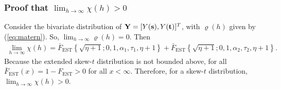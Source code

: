 \documentclass[11pt]{article}
\begin{document}
\subsubsection*{Proof that $\lim_{h \rightarrow \infty} \chi(h) > 0$}
Consider the bivariate distribution of $\mbox{\bf Y} = [Y(\mbox{\bf s}), Y(\mbox{\bf t})]^T$, with $\varrho(h)$ given by (\ref{eq:matern}).
So, $\lim_{h \rightarrow \infty} \varrho(h) = 0$.
Then
\begin{align}
  \lim_{h \rightarrow \infty} \chi(h) = \bar{F}_{\text{EST}}\left\{ \sqrt{\eta + 1}; 0, 1, \alpha_1, \tau_1, \eta + 1 \right\} + \bar{F}_{\text{EST}}\left\{ \sqrt{\eta + 1}; 0, 1, \alpha_2, \tau_2, \eta + 1 \right\}.
\end{align}
Because the extended skew-$t$ distribution is not bounded above, for all $\bar{F}_{\text{EST}}(x) = 1 - F_{\text{EST}} > 0$ for all $x < \infty$.
Therefore, for a skew-$t$ distribution, $\lim_{h \rightarrow \infty} \chi(h) > 0$.



\end{document}
